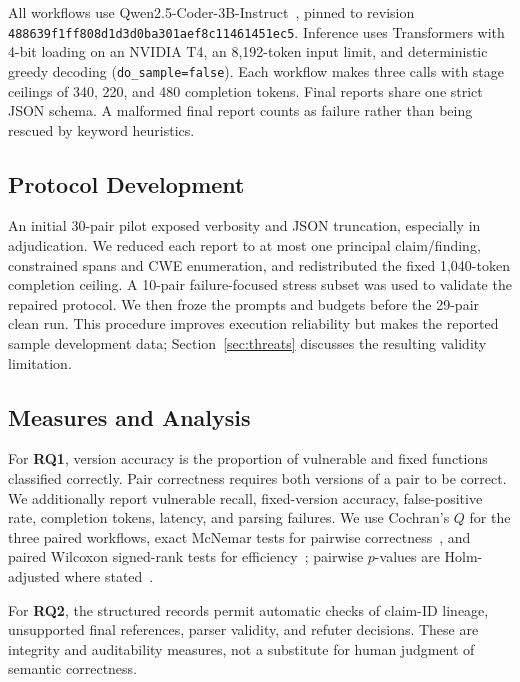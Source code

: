 All workflows use Qwen2.5-Coder-3B-Instruct~\cite{hui2024qwen25coder}, pinned to revision \texttt{488639f1ff808d1d3d0ba301aef8c11461451ec5}. Inference uses Transformers with 4-bit loading on an NVIDIA T4, an 8,192-token input limit, and deterministic greedy decoding (\texttt{do\_sample=false}). Each workflow makes three calls with stage ceilings of 340, 220, and 480 completion tokens. Final reports share one strict JSON schema. A malformed final report counts as failure rather than being rescued by keyword heuristics.

\subsection{Protocol Development}

An initial 30-pair pilot exposed verbosity and JSON truncation, especially in adjudication. We reduced each report to at most one principal claim/finding, constrained spans and CWE enumeration, and redistributed the fixed 1,040-token completion ceiling. A 10-pair failure-focused stress subset was used to validate the repaired protocol. We then froze the prompts and budgets before the 29-pair clean run. This procedure improves execution reliability but makes the reported sample development data; Section~\ref{sec:threats} discusses the resulting validity limitation.

\subsection{Measures and Analysis}

For \textbf{RQ1}, version accuracy is the proportion of vulnerable and fixed functions classified correctly. Pair correctness requires both versions of a pair to be correct. We additionally report vulnerable recall, fixed-version accuracy, false-positive rate, completion tokens, latency, and parsing failures. We use Cochran's $Q$ for the three paired workflows, exact McNemar tests for pairwise correctness~\cite{cochran1950,mcnemar1947}, and paired Wilcoxon signed-rank tests for efficiency~\cite{wilcoxon1945}; pairwise $p$-values are Holm-adjusted where stated~\cite{holm1979}.

For \textbf{RQ2}, the structured records permit automatic checks of claim-ID lineage, unsupported final references, parser validity, and refuter decisions. These are integrity and auditability measures, not a substitute for human judgment of semantic correctness.

